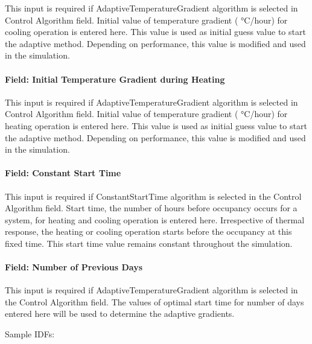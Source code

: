 This input is required if AdaptiveTemperatureGradient algorithm is selected in Control Algorithm field. Initial value of temperature gradient ( °C/hour) for cooling operation is entered here. This value is used as initial guess value to start the adaptive method. Depending on performance, this value is modified and used in the simulation.

\paragraph{Field: Initial Temperature Gradient during Heating}\label{field-initial-temperature-gradient-during-heating}

This input is required if AdaptiveTemperatureGradient algorithm is selected in Control Algorithm field. Initial value of temperature gradient ( °C/hour) for heating operation is entered here. This value is used as initial guess value to start the adaptive method. Depending on performance, this value is modified and used in the simulation.

\paragraph{Field: Constant Start Time}\label{field-constant-start-time}

This input is required if ConstantStartTime algorithm is selected in the Control Algorithm field. Start time, the number of hours before occupancy occurs for a system, for heating and cooling operation is entered here. Irrespective of thermal response, the heating or cooling operation starts before the occupancy at this fixed time. This start time value remains constant throughout the simulation.

\paragraph{Field: Number of Previous Days}\label{field-number-of-previous-days}

This input is required if AdaptiveTemperatureGradient algorithm is selected in the Control Algorithm field. The values of optimal start time for number of days entered here will be used to determine the adaptive gradients.

Sample IDFs:

